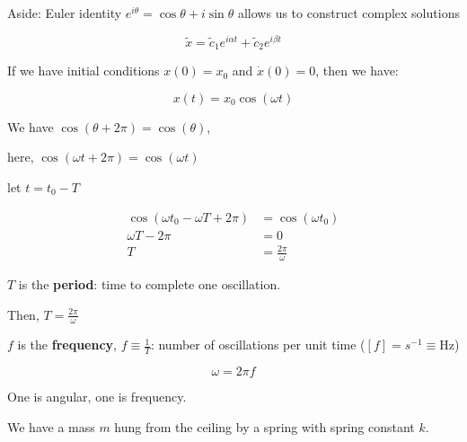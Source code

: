 Aside: Euler identity $e^{i\theta} = \cos\theta + i\sin\theta$ allows us to construct complex solutions

\begin{equation}
	\tilde{x} = \tilde{c}_1 e^{i\alpha t} + \tilde{c}_2 e^{i\beta t}
\end{equation}

If we have initial conditions $x(0) = x_0$ and $\dot x(0) = 0$, then we have:

\begin{equation}
	x(t) = x_0\cos(\omega t)
\end{equation}

We have $\cos(\theta + 2\pi) = \cos(\theta)$,

here, $\cos(\omega t + 2 \pi) = \cos(\omega t)$

let $t = t_0 - T$

\begin{align}
	\cos(\omega t_0 - \omega T + 2\pi) &= \cos(\omega t_0)\\
	\omega T - 2\pi &= 0\\
	T &= \frac{2\pi}{\omega}
\end{align}

$T$ is the \textbf{period}: time to complete one oscillation.

Then, $T = \frac{2\pi}{\omega}$

$f$ is the \textbf{frequency}, $f \equiv \frac{1}{T}$: number of oscillations per unit time ($[f] = s^{-1} \equiv \si{\Hz}$)

\begin{equation}
	\omega = 2\pi f
\end{equation}

One is angular, one is frequency.

\begin{example}
	We have a mass $m$ hung from the ceiling by a spring with spring constant $k$.
\end{example}

